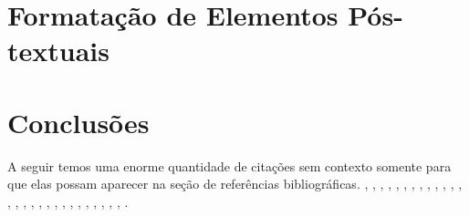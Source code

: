 \documentclass[12pt,times,a4paper,english,brazil,
chapter=TITLE,section=TITLE,subsection=TITLE]{ifes7}
\begin{document}
\chapter{Formatação de Elementos Pós-textuais}
\label{cha:format-pos-text}



\chapter{Conclusões}

A seguir temos uma enorme quantidade de citações sem contexto somente
para que elas possam aparecer na seção de referências bibliográficas.
\cite{abntex2classe}, \cite{abntex2-wiki-como-customizar},
\cite{abntex2modelo-artigo}, \cite{abntex2modelo-relatorio},
\cite{abntex2modelo}, \cite{abntex2cite}, \cite{abntex2cite-alf},
\cite{Ifes2014}, \cite{NBR6024:2012}, \cite{araujo2012},
\cite{talbot2012}, \cite{NBR14724:2011}, \cite{EIA649B},
\cite{bates2010}, \cite{memoir}, \cite{masolo2010}, \cite{babel},
\cite{NBR14724:2005}, \cite{macedo2005}, \cite{guizzardi2005},
\cite{NBR6028:2003}, \cite{NBR10520:2002}, \cite{NBR14724:2002},
\cite{NBR14724:2001}, \cite{guarino1995}, \cite{ibge1993},
\cite{van86}, \cite{dewey1980}, \cite{doxiadis1965}.

\postextual



\end{document}
